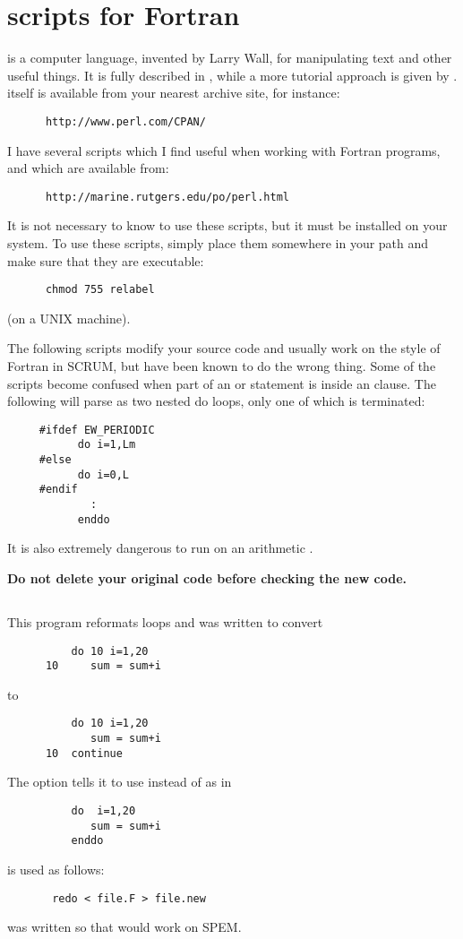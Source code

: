 \section{ scripts for Fortran}
\label{Perl}
 is a computer language, invented by Larry Wall, for
manipulating text and other useful things.  It is fully described in
\citet{perl1}, while a more tutorial approach is given
by \citet{perl2}.   itself is available from your
nearest  archive site, for instance:
\begin{verbatim}
      http://www.perl.com/CPAN/
\end{verbatim}

I have several  scripts which I find useful when working
with Fortran programs, and which are available from:
\begin{verbatim}
      http://marine.rutgers.edu/po/perl.html
\end{verbatim}
It is not necessary to know  to
use these scripts, but it must be installed on your system.  To use
these scripts, simply place them somewhere in your path and make sure
that they are executable:
\begin{verbatim}
      chmod 755 relabel
\end{verbatim}
(on a UNIX machine).

The following scripts modify your source code and usually work on the
style of Fortran in SCRUM, but have been known to do the wrong thing.
Some of the scripts become confused when part of an  or
 statement is inside an  clause.  The following
will parse as two nested do loops, only one of which is terminated:
\begin{verbatim}
     #ifdef EW_PERIODIC
           do i=1,Lm
     #else
           do i=0,L
     #endif
             :
           enddo
\end{verbatim}
It is also extremely dangerous to run  on an arithmetic
.

{\bf Do not delete your original code before checking the new code.}

\subsection{}
This program reformats  loops and was written to convert
\begin{verbatim}
          do 10 i=1,20
      10     sum = sum+i
\end{verbatim}
to
\begin{verbatim}
          do 10 i=1,20
             sum = sum+i
      10  continue
\end{verbatim}
The  option tells it to use  instead of
 as in
\begin{verbatim}
          do  i=1,20
             sum = sum+i
          enddo
\end{verbatim}
 is used as follows:
\begin{verbatim}
       redo < file.F > file.new
\end{verbatim}
 was written so that  would work on SPEM.

